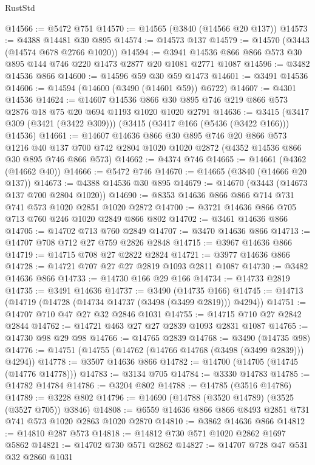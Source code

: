 \begin{lexlean}{RustStd}
\begin{coremodule}
@14566 := @5472 @751
@14570 := @14565 (@3840 (@14566 @20 @137))
@14573 := @4388 @14481 @30 @895
@14574 := @14573 @137
@14579 := @14570 (@3443 (@14574 @678 @2766 @1020))
@14594 := @3941 @14536 @866 @866 @573 @30 @895 @144 @746 @220 @1473 @2877 @20 @1081 @2771 @1087
@14596 := @3482 @14536 @866
@14600 := @14596 @59 @30 @59 @1473
@14601 := @3491 @14536
@14606 := @14594 (@14600 (@3490 (@14601 @59)) @6722)
@14607 := @4301 @14536
@14624 := @14607
    @14536
    @866
    @30
    @895
    @746
    @219
    @866
    @573
    @2876
    @18
    @75
    @20
    @694
    @1193
    @1020
    @1020
    @2791
@14636 := @3415 (@3417 @309 (@3421 (@3422 @309))) (@3415 (@3417 @166 (@5436 (@3422 @166))) @14536)
@14661 := @14607
    @14636
    @866
    @30
    @895
    @746
    @20
    @866
    @573
    @1216
    @40
    @137
    @700
    @742
    @2804
    @1020
    @1020
    @2872
    (@4352 @14536 @866 @30 @895 @746 @866 @573)
@14662 := @4374 @746
@14665 := @14661 (@4362 (@14662 @40))
@14666 := @5472 @746
@14670 := @14665 (@3840 (@14666 @20 @137))
@14673 := @4388 @14536 @30 @895
@14679 := @14670 (@3443 (@14673 @137 @700 @2804 @1020))
@14690 := @8353 @14636 @866 @866 @714 @731 @741 @573 @1020 @2851 @1020 @2872
@14700 := @3721 @14636 @866 @705 @713 @760 @246 @1020 @2849 @866 @802
@14702 := @3461 @14636 @866
@14705 := @14702 @713 @760 @2849
@14707 := @3470 @14636 @866
@14713 := @14707 @708 @712 @27 @759 @2826 @2848
@14715 := @3967 @14636 @866
@14719 := @14715 @708 @27 @2822 @2824
@14721 := @3977 @14636 @866
@14728 := @14721 @707 @27 @27 @2819 @1093 @2811 @1087
@14730 := @3482 @14636 @866
@14733 := @14730 @166 @29 @166
@14734 := @14733 @2819
@14735 := @3491 @14636
@14737 := @3490 (@14735 @166)
@14745 := @14713 (@14719 (@14728 (@14734 @14737 (@3498 (@3499 @2819))) @4294))
@14751 := @14707 @710 @47 @27 @32 @2846 @1031
@14755 := @14715 @710 @27 @2842 @2844
@14762 := @14721 @463 @27 @27 @2839 @1093 @2831 @1087
@14765 := @14730 @98 @29 @98
@14766 := @14765 @2839
@14768 := @3490 (@14735 @98)
@14776 := @14751 (@14755 (@14762 (@14766 @14768 (@3498 (@3499 @2839))) @4294))
@14778 := @3507 @14636 @866
@14782 := @14700 (@14705 (@14745 (@14776 @14778)))
@14783 := @3134 @705
@14784 := @3330 @14783
@14785 := @14782 @14784
@14786 := @3204 @802
@14788 := @14785 (@3516 @14786)
@14789 := @3228 @802
@14796 := @14690 (@14788 (@3520 @14789) (@3525 (@3527 @705)) @3846)
@14808 := @6559 @14636 @866 @866 @8493 @2851 @731 @741 @573 @1020 @2863 @1020 @2870
@14810 := @3862 @14636 @866
@14812 := @14810 @287 @573
@14818 := @14812 @730 @571 @1020 @2862 @1697 @5862
@14821 := @14702 @730 @571 @2862
@14827 := @14707 @728 @47 @531 @32 @2860 @1031

\end{coremodule}
\end{lexlean}
